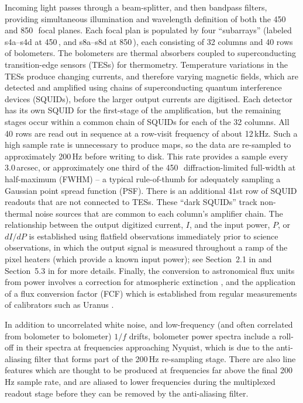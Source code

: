 \documentclass[useAMS,usenatbib,nofootinbib]{mn2e}
\begin{document}
Incoming light passes through a beam-splitter, and then bandpass
filters, providing simultaneous illumination and wavelength definition
of both the 450 and 850\,\micron\ focal planes. Each focal plan is
populated by four ``subarrays'' (labeled s4a--s4d at 450\,\micron, and
s8a--s8d at 850\,\micron), each consisting of 32 columns and 40 rows
of bolometers. The bolometers are thermal absorbers coupled to
superconducting transition-edge sensors (TESs) for thermometry.
Temperature variations in the TESs produce changing currents, and
therefore varying magnetic fields, which are detected and amplified
using chains of superconducting quantum interference devices (SQUIDs),
before the larger output currents are digitised. Each detector has its
own SQUID for the first-stage of the amplification, but the remaining
stages occur within a common chain of SQUIDs for each of the 32
columns. All 40 rows are read out in sequence at a row-visit frequency
of about 12\,kHz. Such a high sample rate is unnecessary to produce
maps, so the data are re-sampled to approximately 200\,Hz before
writing to disk. This rate provides a sample every 3.0\,arcsec, or
approximately one third of the 450\,\micron\ diffraction-limited
full-width at half-maximum (FWHM) -- a typical rule-of-thumb for
adequately sampling a Gaussian point spread function (PSF). There is
an additional 41st row of SQUID readouts that are not connected to
TESs. These ``dark SQUIDs'' track non-thermal noise sources that are
common to each column's amplifier chain. The relationship between the
output digitized current, $I$, and the input power, $P$, or $dI/dP$ is
established using flatfield observations immediately prior to science
observations, in which the output signal is measured throughout a ramp
of the pixel heaters (which provide a known input power); see
Section~2.1 in \citet{dempsey2012} and Section~5.3 in
\citet{holland2012} for more details. Finally, the conversion to
astronomical flux units from power involves a correction for
atmospheric extinction \citep[primarily using the JCMT Water Vapour
Monitor to track line-of-sight opacity variations, see Section~3
in][]{dempsey2012}, and the application of a flux conversion factor
(FCF) which is established from regular measurements of calibrators
such as Uranus \citep[Section~5 in][]{dempsey2012}.

In addition to uncorrelated white noise, and low-frequency (and often
correlated from bolometer to bolometer) $1/f$ drifts, bolometer power
spectra include a roll-off in their spectra at frequencies approaching
Nyquist, which is due to the anti-aliasing filter that forms part of
the 200\,Hz re-sampling stage. There are also line features which are
thought to be produced at frequencies far above the final 200\,Hz
sample rate, and are aliased to lower frequencies during the
multiplexed readout stage before they can be removed by the
anti-aliasing filter.
\end{document}
